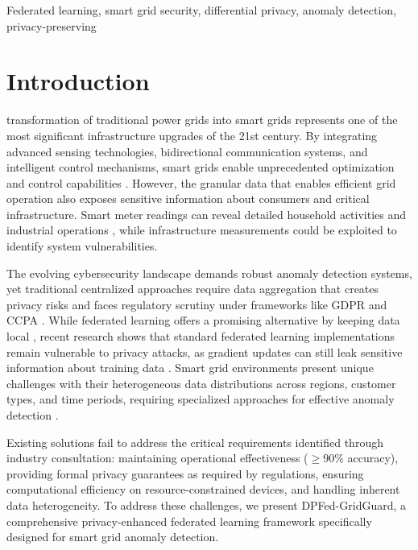\documentclass{ieeeaccess}
\theoremstyle{definition}
\begin{document}
\begin{keywords}
Federated learning, smart grid security, differential privacy, anomaly detection, privacy-preserving
\end{keywords}

\titlepgskip=-21pt

\maketitle

\section{Introduction}
\label{sec:introduction}
 transformation of traditional power grids into smart grids represents one of the most significant infrastructure upgrades of the 21st century. By integrating advanced sensing technologies, bidirectional communication systems, and intelligent control mechanisms, smart grids enable unprecedented optimization and control capabilities \cite{farhangi2010path, gungor2011smart}. However, the granular data that enables efficient grid operation also exposes sensitive information about consumers and critical infrastructure. Smart meter readings can reveal detailed household activities and industrial operations \cite{molina2010private, mckenna2012smart}, while infrastructure measurements could be exploited to identify system vulnerabilities.

The evolving cybersecurity landscape demands robust anomaly detection systems, yet traditional centralized approaches require data aggregation that creates privacy risks and faces regulatory scrutiny under frameworks like GDPR and CCPA \cite{voigt2017gdpr, pardau2018california}. While federated learning offers a promising alternative by keeping data local \cite{mcmahan2017communication, kairouz2021advances}, recent research shows that standard federated learning implementations remain vulnerable to privacy attacks, as gradient updates can still leak sensitive information about training data \cite{jithish2023comprehensive, shrestha2024anomaly, mothukuri2021survey}. Smart grid environments present unique challenges with their heterogeneous data distributions across regions, customer types, and time periods, requiring specialized approaches for effective anomaly detection \cite{wen2021feddetect, perez2024review}.

Existing solutions fail to address the critical requirements identified through industry consultation: maintaining operational effectiveness ($\geq90$\% accuracy), providing formal privacy guarantees as required by regulations, ensuring computational efficiency on resource-constrained devices, and handling inherent data heterogeneity. To address these challenges, we present DPFed-GridGuard, a comprehensive privacy-enhanced federated learning framework specifically designed for smart grid anomaly detection.
\end{document}
